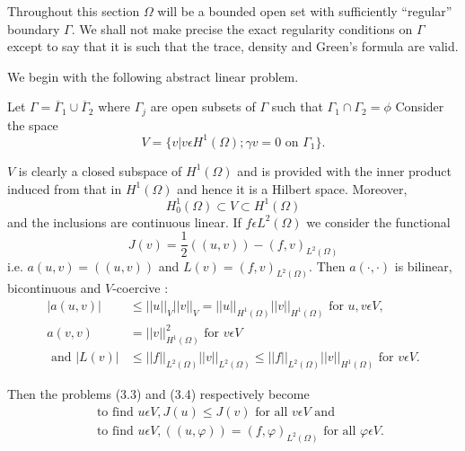 Throughout this section $\Omega$ will be a bounded open set with sufficiently ``regular'' boundary $\Gamma$. We shall not make precise the exact regularity conditions on $\Gamma$ except to say that it is such that the trace, density and Green's formula are valid.

We begin with the following abstract linear problem.

\begin{example}\label{chap2-exam5.1}
Let $\Gamma = \overline{\Gamma}_{1} \cup  \overline{\Gamma}_{2}$ where $\Gamma_{j}$ are open subsets of $\Gamma$ such that $\Gamma_{1} \cap \Gamma_{2} = \phi$ Consider the space
\begin{equation*}
V = \{v|v \epsilon H^{1} (\Omega); \gamma v = 0 \text{ on } \Gamma_{1}\}.\tag{5.1}\label{chap2-eq5.1}
\end{equation*}
\end{example}

$V$ is clearly a closed subspace of $H^{1} (\Omega)$ and is provided with the inner product induced from that in $H^{1}(\Omega)$ and hence it is a Hilbert space. Moreover,
\begin{equation*}
H_{0}^{1} (\Omega) \subset V \subset H^{1} (\Omega)\tag{5.2}\label{chap2-eq5.2}
\end{equation*}
and the inclusions are continuous linear. If $f \epsilon L^{2} (\Omega)$ we consider the functional
\begin{equation*}
J(v) = \frac{1}{2} ((u, v)) - (f, v)_{L^{2} (\Omega)}\tag{5.3}\label{chap3-eq5.3}
\end{equation*}
i.e. $a(u, v) = ((u, v))$ and $L(v) = (f, v)_{L^{2}(\Omega)}$. Then $a(\cdot , \cdot)$ is bilinear, bicontinuous and $V$-coercive :
\begin{align*}
|a(u, v)| & \leq ||u||_{V} ||v||_{V} = ||u||_{H^{1} (\Omega)} ||v||_{H^{1}(\Omega)} \text{ for } u, v \epsilon V,\\
a(v, v) & = ||v||_{H^{1}(\Omega)}^{2} \text{ for } v \epsilon V\\
\text{ and } |L(v)| & \leq ||f||_{L^{2}(\Omega)} ||v||_{L^{2}(\Omega)} \leq ||f||_{L^{2}(\Omega)} ||v||_{H^{1}(\Omega)} \text{ for } v \epsilon V.
\end{align*}\pageoriginale

Then the problems (3.3) and (3.4) respectively become
\begin{align*}
&\text{ to find } u \epsilon V, J(u) \leq J(v) \text{ for all } v \epsilon V \text{ and }\tag{5.4}\label{chap2-eq5.4}\\
& \text{ to find } u \epsilon V, ((u, \varphi)) = (f, \varphi)_{L^{2} (\Omega)} \text{ for all } \varphi \epsilon V.\tag{5.5}\label{chap2-eq5.5}
\end{align*}

